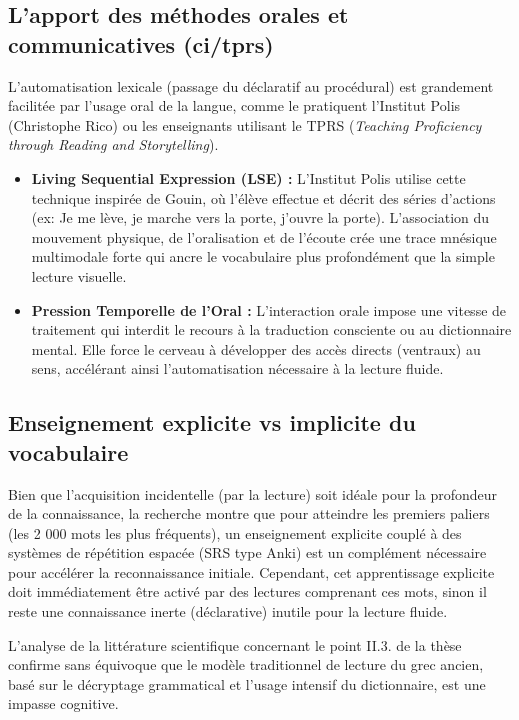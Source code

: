 {\subsection{L'apport des méthodes orales et communicatives (ci/tprs)}

L'automatisation lexicale (passage du déclaratif au procédural) est grandement facilitée par l'usage
oral de la langue, comme le pratiquent l'Institut Polis (Christophe Rico) ou les enseignants
utilisant le TPRS (\textit{Teaching Proficiency through Reading and Storytelling}).

\begin{itemize}\item \textbf{Living Sequential Expression (LSE) :} L'Institut Polis utilise cette technique inspirée de Gouin, où l'élève effectue et décrit des séries d'actions (ex: \og Je me lève, je marche vers la porte, j'ouvre la porte\fg{}). L'association du mouvement physique, de l'oralisation et de l'écoute crée une trace mnésique multimodale forte qui ancre le vocabulaire plus profondément que la simple lecture visuelle.\cite{II-3-2-ref58}\item \textbf{Pression Temporelle de l'Oral :} L'interaction orale impose une vitesse de traitement qui interdit le recours à la traduction consciente ou au dictionnaire mental. Elle force le cerveau à développer des accès directs (ventraux) au sens, accélérant ainsi l'automatisation nécessaire à la lecture fluide.\cite{II-3-2-ref40}\end{itemize}

\subsection{Enseignement explicite vs implicite du vocabulaire}

Bien que l'acquisition incidentelle (par la lecture) soit idéale pour la profondeur de la
connaissance, la recherche montre que pour atteindre les premiers paliers (les 2 000 mots les plus
fréquents), un enseignement explicite couplé à des systèmes de répétition espacée (SRS \- type Anki)
est un complément nécessaire pour accélérer la reconnaissance initiale. Cependant, cet apprentissage
explicite doit immédiatement être \og activé\fg{} par des lectures comprenant ces mots, sinon il
reste une connaissance inerte (déclarative) inutile pour la lecture fluide.\cite{II-3-2-ref38}

L'analyse de la littérature scientifique concernant le point II.3.\cite{II-3-2-ref2} de la thèse
confirme sans équivoque que le modèle traditionnel de lecture du grec ancien, basé sur le décryptage
grammatical et l'usage intensif du dictionnaire, est une impasse cognitive.

}
